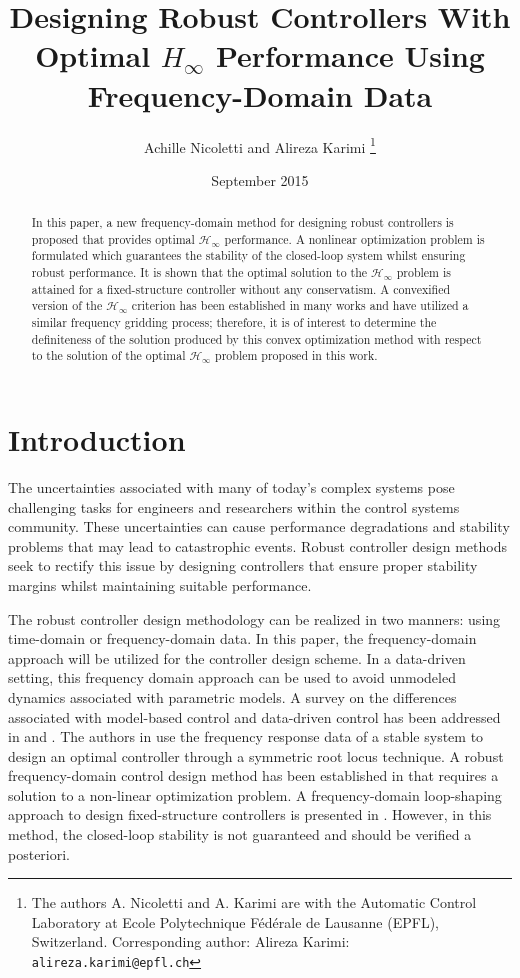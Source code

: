 \documentclass[letterpaper, 10 pt, conference]{ieeeconf}  %
\title{Designing Robust Controllers With Optimal $H_{\infty}$ Performance Using Frequency-Domain Data}
\author{Achille Nicoletti and Alireza Karimi
\thanks{The authors A. Nicoletti and A. Karimi are with the Automatic Control Laboratory at Ecole Polytechnique F\'ed\'erale de Lausanne (EPFL), Switzerland.
       Corresponding author: Alireza Karimi: {\tt\small alireza.karimi@epfl.ch}}
\date{September 2015}
}
\begin{document}
\maketitle
\thispagestyle{empty}
\pagestyle{empty}


\begin{abstract}
In this paper, a new frequency-domain method for designing robust controllers is proposed that provides optimal $\mathcal{H}_{\infty}$ performance. A nonlinear optimization problem is formulated which guarantees the stability of the closed-loop system whilst ensuring robust performance. It is shown that the optimal solution to the $\mathcal{H}_\infty$ problem is attained for a fixed-structure controller without any conservatism. A convexified version of the $\mathcal{H}_{\infty}$ criterion has been established in many works and have utilized a similar frequency gridding process; therefore, it is of interest to determine the definiteness of the solution produced by this convex optimization method with respect to the solution of the optimal $\mathcal{H}_{\infty}$ problem proposed in this work. 
\end{abstract}


\section{Introduction}
The uncertainties associated with many of today's complex systems pose challenging tasks for engineers and researchers within the control systems community. These uncertainties can cause performance degradations and stability problems that may lead to catastrophic events. Robust controller design methods seek to rectify this issue by designing controllers that ensure proper stability margins whilst maintaining suitable performance. 

The robust controller design methodology can be realized in two manners: using time-domain or frequency-domain data. In this paper, the frequency-domain approach will be utilized for the controller design scheme. In a data-driven setting, this frequency domain approach can be used to avoid unmodeled dynamics associated with parametric models. A survey on the differences associated with model-based control and data-driven control has been addressed in \cite{HW13} and \cite{BCE12}. The authors in \cite{HDAV10} use the frequency response data of a stable system to design an optimal controller through a symmetric root locus technique. A robust frequency-domain control design method has been established in \cite{KNND13b} that requires a solution to a non-linear optimization problem. A frequency-domain loop-shaping approach to design fixed-structure controllers is presented in \cite{KNND13c}. However, in this method, the closed-loop stability is not guaranteed and should be verified a posteriori.
\end{document}
